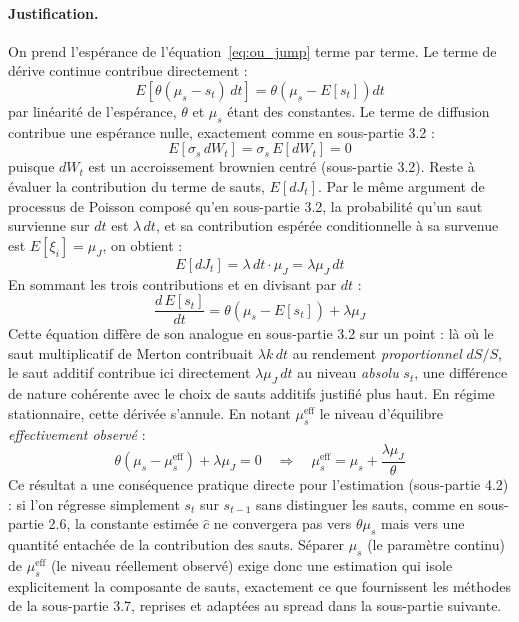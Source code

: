 \documentclass{article}
\begin{document}
\paragraph{Justification.} On prend l'espérance de l'équation~\eqref{eq:ou_jump} terme par terme.
Le terme de dérive continue contribue directement :
\begin{equation}
E\left[\theta(\mu_s-s_t)\,dt\right] = \theta\left(\mu_s - E[s_t]\right) dt
\end{equation}
par linéarité de l'espérance, $\theta$ et $\mu_s$ étant des constantes.
Le terme de diffusion contribue une espérance nulle, exactement comme en sous-partie 3.2 :
\begin{equation}
E[\sigma_s\, dW_t] = \sigma_s\, E[dW_t] = 0
\end{equation}
puisque $dW_t$ est un accroissement brownien centré (sous-partie 3.2).
Reste à évaluer la contribution du terme de sauts, $E[dJ_t]$. Par le même argument de processus de Poisson composé qu'en sous-partie 3.2, la probabilité qu'un saut survienne sur $dt$ est $\lambda\,dt$, et sa contribution espérée conditionnelle à sa survenue est $E[\xi_i]=\mu_J$, on obtient :
\begin{equation}
E[dJ_t] = \lambda\,dt \cdot \mu_J = \lambda\mu_J\, dt
\end{equation}
En sommant les trois contributions et en divisant par $dt$ :
\begin{equation}
\frac{d\,E[s_t]}{dt} = \theta\left(\mu_s-E[s_t]\right) + \lambda\mu_J
\end{equation}
Cette équation diffère de son analogue en sous-partie 3.2 sur un point : là où le saut multiplicatif de Merton contribuait $\lambda k\,dt$ au rendement \emph{proportionnel} $dS/S$, le saut additif contribue ici directement $\lambda\mu_J\,dt$ au niveau \emph{absolu} $s_t$, une différence de nature cohérente avec le choix de sauts additifs justifié plus haut.
En régime stationnaire, cette dérivée s'annule. En notant $\mu_s^{\text{eff}}$ le niveau d'équilibre \emph{effectivement observé} :
\begin{equation}
\theta\left(\mu_s - \mu_s^{\text{eff}}\right) + \lambda\mu_J = 0 \quad \Longrightarrow \quad \mu_s^{\text{eff}} = \mu_s + \frac{\lambda\mu_J}{\theta}
\end{equation}
Ce résultat a une conséquence pratique directe pour l'estimation (sous-partie 4.2) : si l'on régresse simplement $s_t$ sur $s_{t-1}$ sans distinguer les sauts, comme en sous-partie 2.6, la constante estimée $\hat{c}$ ne convergera pas vers $\theta\mu_s$ mais vers une quantité entachée de la contribution des sauts. Séparer $\mu_s$ (le paramètre continu) de $\mu_s^{\text{eff}}$ (le niveau réellement observé) exige donc une estimation qui isole explicitement la composante de sauts, exactement ce que fournissent les méthodes de la sous-partie 3.7, reprises et adaptées au spread dans la sous-partie suivante. 
\end{document}
